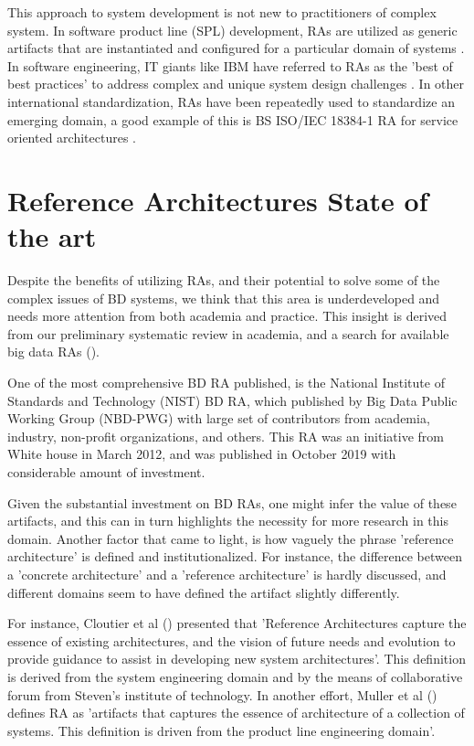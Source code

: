 \documentclass[review]{elsarticle}
\begin{document}
This approach to system development is not new to practitioners of complex system. In software product line (SPL) development, RAs are utilized as generic artifacts that are instantiated and configured for a particular domain of systems \cite{Derras}. In software engineering, IT giants like IBM have referred to RAs as the 'best of best practices' to address complex and unique system design challenges \cite{Cloutier}. In other international standardization, RAs have been repeatedly used to standardize an emerging domain, a good example of this is BS ISO/IEC 18384-1 RA for service oriented architectures \cite{Iso18384-1}. 

\section{Reference Architectures State of the art}

Despite the benefits of utilizing RAs, and their potential to solve some of the complex issues of BD systems, we think that this area is underdeveloped and needs more attention from both academia and practice. This insight is derived from our preliminary systematic review in academia, and a search for available big data RAs (\cite{AtaeiACIS}).

 One of the most comprehensive BD RA published, is the National Institute of Standards and Technology (NIST) BD RA, which published by Big Data Public Working Group (NBD-PWG) with large set of contributors from academia, industry, non-profit organizations, and others. This RA was an initiative from White house in March 2012, and was published in October 2019 with considerable amount of investment. 

Given the substantial investment on BD RAs, one might infer the value of these artifacts, and this can in turn highlights the necessity for more research in this domain. Another factor that came to light, is how vaguely the phrase 'reference architecture' is defined and institutionalized. For instance, the difference between a 'concrete architecture' and a 'reference architecture' is hardly discussed, and different domains seem to have defined the artifact slightly differently. 

For instance, Cloutier et al (\cite{Cloutier}) presented that 'Reference Architectures capture the essence of existing architectures, and the vision of future needs and evolution to provide guidance to assist in developing new system architectures'. This definition is derived from the system engineering domain and by the means of collaborative forum from Steven's institute of technology. In another effort, Muller et al (\cite{muller2008reference}) defines RA as 'artifacts that captures the essence of architecture of a collection of systems. This definition is driven from the product line engineering domain'. 
\end{document}
